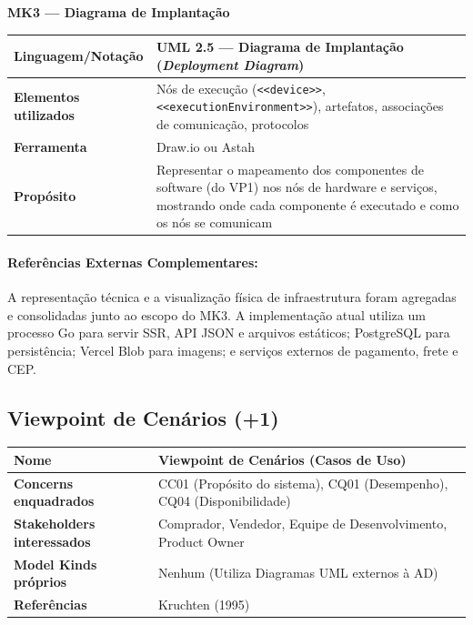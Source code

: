 \documentclass[12pt, a4paper]{article}
\begin{document}
\noindent\textbf{MK3 --- Diagrama de Implantação}
\begin{longtable}{|p{4.5cm}|p{10cm}|}
\hline
\textbf{Linguagem/Notação} & UML 2.5 --- Diagrama de Implantação (\textit{Deployment Diagram}) \\
\hline
\textbf{Elementos utilizados} & Nós de execução (\texttt{<<device>>}, \texttt{<<executionEnvironment>>}), artefatos, associações de comunicação, protocolos \\
\hline
\textbf{Ferramenta} & Draw.io ou Astah \\
\hline
\textbf{Propósito} & Representar o mapeamento dos componentes de software (do VP1) nos nós de hardware e serviços, mostrando onde cada componente é executado e como os nós se comunicam \\
\hline
\end{longtable}

\paragraph{Referências Externas Complementares:} A representação técnica e a visualização física de infraestrutura foram agregadas e consolidadas junto ao escopo do MK3. A implementação atual utiliza um processo Go para servir SSR, API JSON e arquivos estáticos; PostgreSQL para persistência; Vercel Blob para imagens; e serviços externos de pagamento, frete e CEP.

\subsection{Viewpoint de Cenários (+1)}

\begin{longtable}{|p{4.5cm}|p{10cm}|}
\hline
\textbf{Nome} & Viewpoint de Cenários (Casos de Uso) \\
\hline
\textbf{Concerns enquadrados} & CC01 (Propósito do sistema), CQ01 (Desempenho), CQ04 (Disponibilidade) \\
\hline
\textbf{Stakeholders interessados} & Comprador, Vendedor, Equipe de Desenvolvimento, Product Owner \\
\hline
\textbf{Model Kinds próprios} & Nenhum (Utiliza Diagramas UML externos à AD) \\
\hline
\textbf{Referências} & Kruchten (1995) \\
\hline
\end{longtable}
\end{document}
